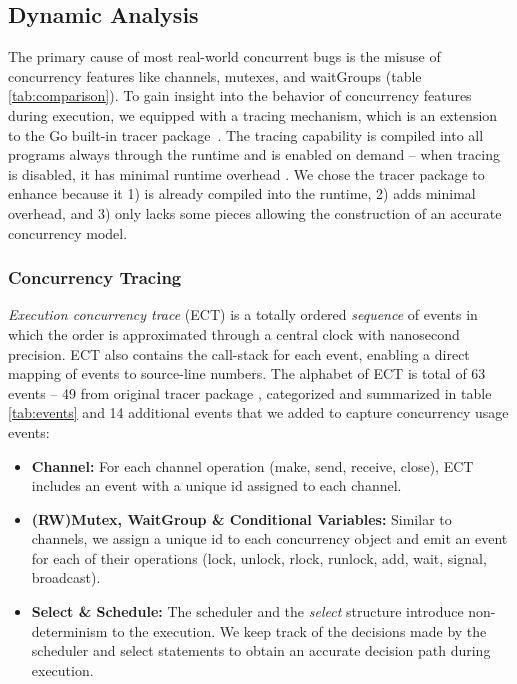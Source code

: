 \subsection{Dynamic Analysis}
\label{sec:dynamic_analysis}
The primary cause of most real-world concurrent bugs is the misuse of concurrency features like channels, mutexes, and waitGroups (table \ref{tab:comparison}).
%
To gain insight into the behavior of concurrency features during execution, we equipped \goat with a tracing mechanism, which is an extension to the Go built-in tracer package~\cite{go-cmd-trace}.
%
The tracing capability is compiled into all programs always through the runtime and is enabled on demand -- when tracing is disabled, it has minimal runtime overhead \cite{go-exec-tracer-doc}.
%
We chose the tracer package to enhance because it 1) is already compiled into the runtime, 2) adds minimal overhead, and 3) only lacks some pieces allowing the construction of an accurate concurrency model.
%

\subsubsection{Concurrency Tracing}
\textit{Execution concurrency trace} (ECT) is a totally ordered \textit{sequence} of events in which the order is approximated through a central clock with nanosecond precision.
%
ECT also contains the call-stack for each event, enabling a direct mapping of events to source-line numbers.
%
The alphabet of ECT is total of 63 events -- 49 from original tracer package \cite{goParserSource}, categorized and summarized in table \ref{tab:events} and 14 additional events that we added to capture concurrency usage events:
%
\begin{itemize}
    \item \textbf{Channel:} For each channel operation (make, send, receive, close), ECT includes an event with a unique id assigned to each channel.
    \item \textbf{(RW)Mutex, WaitGroup \& Conditional Variables:} Similar to channels, we assign a unique id to each concurrency object and emit an event for each of their operations (lock, unlock, rlock, runlock, add, wait, signal, broadcast).
    \item \textbf{Select \& Schedule:} The scheduler and the \textit{select} structure introduce non-determinism to the execution. We keep track of the decisions made by the scheduler and select statements to obtain an accurate decision path during execution.
\end{itemize}

